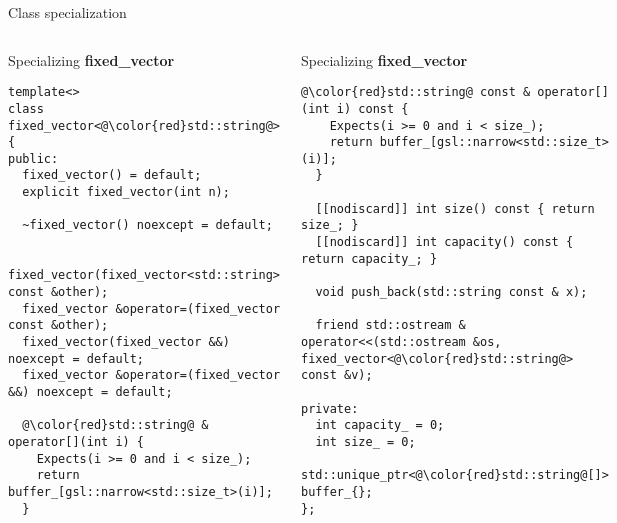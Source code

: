 \begin{frame}[t,fragile,shrink=20]{Class specialization}
\begin{columns}[T]

\begin{block}{Specializing \textbf{fixed\_vector}}
\begin{lstlisting}[escapechar=@]
template<>
class fixed_vector<@\color{red}std::string@> {
public:
  fixed_vector() = default;
  explicit fixed_vector(int n);

  ~fixed_vector() noexcept = default;

  fixed_vector(fixed_vector<std::string> const &other);
  fixed_vector &operator=(fixed_vector const &other);
  fixed_vector(fixed_vector &&) noexcept = default;
  fixed_vector &operator=(fixed_vector &&) noexcept = default;

  @\color{red}std::string@ & operator[](int i) {
    Expects(i >= 0 and i < size_);
    return buffer_[gsl::narrow<std::size_t>(i)];
  }

\end{lstlisting}
\end{block}

\begin{block}{Specializing \textbf{fixed\_vector}}
\begin{lstlisting}[escapechar=@]
  @\color{red}std::string@ const & operator[](int i) const {
    Expects(i >= 0 and i < size_);
    return buffer_[gsl::narrow<std::size_t>(i)];
  }

  [[nodiscard]] int size() const { return size_; }
  [[nodiscard]] int capacity() const { return capacity_; }

  void push_back(std::string const & x);

  friend std::ostream & operator<<(std::ostream &os, fixed_vector<@\color{red}std::string@> const &v);

private:
  int capacity_ = 0;
  int size_ = 0;
  std::unique_ptr<@\color{red}std::string@[]> buffer_{};
};
\end{lstlisting}
\end{block}

\end{columns}
\end{frame}

